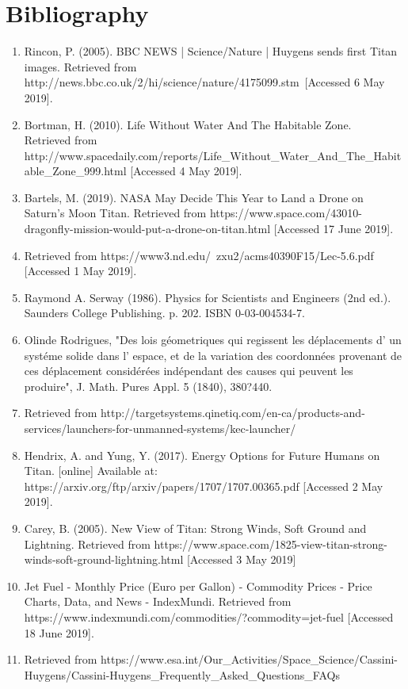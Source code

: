 \documentclass[10pt,a4paper]{article}
\begin{document}
	\section*{Bibliography}
	\begin{enumerate}        
		\item Rincon, P. (2005). BBC NEWS | Science/Nature | Huygens sends first Titan images. Retrieved from http://news.bbc.co.uk/2/hi/science/nature/4175099.stm\ [Accessed 6 May 2019].
		
		\item Bortman, H. (2010). Life Without Water And The Habitable Zone. \\Retrieved from\\ http://www.spacedaily.com/reports/Life\_Without\_Water\_And\_The\_Habitable\_Zone\_999.html [Accessed 4 May 2019].
		
		\item Bartels, M. (2019). NASA May Decide This Year to Land a Drone on Saturn's Moon Titan. Retrieved from https://www.space.com/43010-dragonfly-mission-would-put-a-drone-on-titan.html [Accessed 17 June 2019].
		
		\item Retrieved from https://www3.nd.edu/~zxu2/acms40390F15/Lec-5.6.pdf [Accessed 1 May 2019].
		
		\item Raymond A. Serway (1986). Physics for Scientists and Engineers (2nd ed.). Saunders College Publishing. p. 202. ISBN 0-03-004534-7.
		
		\item Olinde Rodrigues, "Des lois géometriques qui regissent les déplacements d' un systéme solide dans l' espace, et de la variation des coordonnées provenant de ces déplacement considérées indépendant des causes qui peuvent les produire", J. Math. Pures Appl. 5 (1840), 380?440.
		
		\item Retrieved from http://targetsystems.qinetiq.com/en-ca/products-and-services/launchers-for-unmanned-systems/kec-launcher/
		
		\item Hendrix, A. and Yung, Y. (2017). Energy Options for Future Humans on Titan. [online] Available at: https://arxiv.org/ftp/arxiv/papers/1707/1707.00365.pdf [Accessed 2 May 2019].
		
		\item Carey, B. (2005). New View of Titan: Strong Winds, Soft Ground and Lightning. Retrieved from https://www.space.com/1825-view-titan-strong-winds-soft-ground-lightning.html [Accessed 3 May 2019]
		
		\item Jet Fuel - Monthly Price (Euro per Gallon) - Commodity Prices - Price Charts, Data, and News - IndexMundi. Retrieved from \\https://www.indexmundi.com/commodities/?commodity=jet-fuel [Accessed 18 June 2019].    
		\item Retrieved from https://www.esa.int/Our\_Activities/Space\_Science/Cassini-Huygens/Cassini-Huygens\_Frequently\_Asked\_Questions\_FAQs
	\end{enumerate}
	
\end{document}
